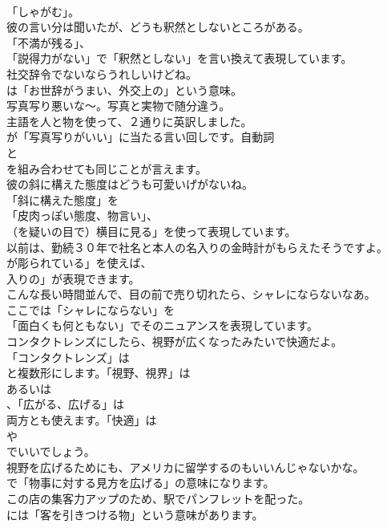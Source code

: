 \documentclass[8pt]{extreport}
\begin{document}
\begin{CJK}{UTF8}{min}
\\	「しゃがむ」。	
\\	彼の言い分は聞いたが、どうも釈然としないところがある。 
\\	「不満が残る」、
\\	「説得力がない」で「釈然としない」を言い換えて表現しています。	
\\	社交辞令でないならうれしいけどね。 
\\	は「お世辞がうまい、外交上の」という意味。	
\\	写真写り悪いな～。写真と実物で随分違う。 
\\	主語を人と物を使って、２通りに英訳しました。
\\	が「写真写りがいい」に当たる言い回しです。自動詞
\\	と
\\	を組み合わせても同じことが言えます。	
\\	彼の斜に構えた態度はどうも可愛いげがないね。 
\\	「斜に構えた態度」を
\\	「皮肉っぽい態度、物言い」、
\\	（を疑いの目で）横目に見る」を使って表現しています。	
\\	以前は、勤続３０年で社名と本人の名入りの金時計がもらえたそうですよ。 
\\	が彫られている」を使えば、
\\	入りの」が表現できます。	
\\	こんな長い時間並んで、目の前で売り切れたら、シャレにならないなあ。 
\\	ここでは「シャレにならない」を
\\	「面白くも何ともない」でそのニュアンスを表現しています。	
\\	コンタクトレンズにしたら、視野が広くなったみたいで快適だよ。 
\\	「コンタクトレンズ」は
\\	と複数形にします。「視野、視界」は
\\	あるいは
\\	、「広がる、広げる」は
\\	両方とも使えます。「快適」は
\\	や
\\	でいいでしょう。	
\\	視野を広げるためにも、アメリカに留学するのもいいんじゃないかな。 
\\	で「物事に対する見方を広げる」の意味になります。	
\\	この店の集客力アップのため、駅でパンフレットを配った。 
\\	には「客を引きつける物」という意味があります。	

\end{CJK}
\end{document}
